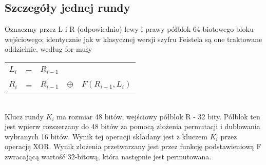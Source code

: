 \documentclass[12pt, letterpaper, titlepage]{article}
\begin{document}
\subsection{Szczegóły jednej rundy}
Oznaczmy przez L i R (odpowiednio) lewy i prawy półblok 64-biotowego bloku wejściowego; identycznie jak w klasycznej wersji szyfru Feistela są one traktowane oddzielnie, według for-muły 
\begin{table}[h]
\centering
\begin{tabular}{c c c c c}
$L_i$ & = & $R_{i-1}$  \\
$R_i$ & = & $R_{i-1}$ & $\oplus$ & $F(R_{i-1}, L_i)$ \\
\end{tabular}
\end{table} \\
Klucz rundy $K_i$ ma rozmiar 48 bitów, wejściowy półblok R - 32 bity. Półblok ten jest wpierw rozszerzany do 48 bitów za pomocą złożenia permutacji i dublowania wybranych 16 bitów. Wynik tej operacji składany jest z kluczem $K_i$ przez operację XOR. Wynik złożenia przetwarzany jest przez funkcję podstawieniową F zwracającą wartość 32-bitową, która następnie jest permutowana.
\end{document}
